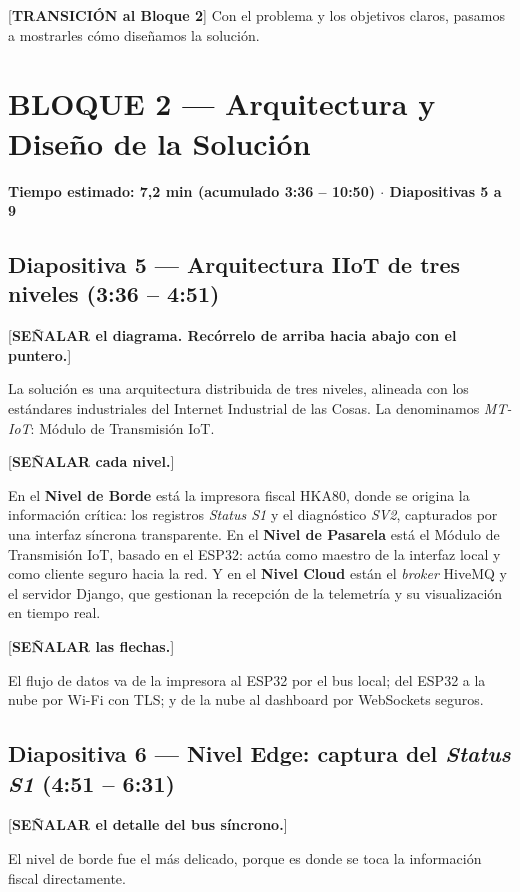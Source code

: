 \documentclass[11pt, a4paper]{article}
\begin{document}
[\textbf{TRANSICIÓN al Bloque 2}] Con el problema y los objetivos claros, pasamos a mostrarles cómo diseñamos la solución.

\hrulefill

\section*{BLOQUE 2 — Arquitectura y Diseño de la Solución}
\textbf{Tiempo estimado: 7,2 min (acumulado 3:36 – 10:50) $\cdot$ Diapositivas 5 a 9}

\subsection*{Diapositiva 5 — Arquitectura IIoT de tres niveles (3:36 – 4:51)}

[\textbf{SEÑALAR el diagrama. Recórrelo de arriba hacia abajo con el puntero.}]

La solución es una arquitectura distribuida de tres niveles, alineada con los estándares industriales del Internet Industrial de las Cosas. La denominamos \textit{MT-IoT}: Módulo de Transmisión IoT.

[\textbf{SEÑALAR cada nivel.}]

En el \textbf{Nivel de Borde} está la impresora fiscal HKA80, donde se origina la información crítica: los registros \textit{Status S1} y el diagnóstico \textit{SV2}, capturados por una interfaz síncrona transparente. En el \textbf{Nivel de Pasarela} está el Módulo de Transmisión IoT, basado en el ESP32: actúa como maestro de la interfaz local y como cliente seguro hacia la red. Y en el \textbf{Nivel Cloud} están el \textit{broker} HiveMQ y el servidor Django, que gestionan la recepción de la telemetría y su visualización en tiempo real.

[\textbf{SEÑALAR las flechas.}]

El flujo de datos va de la impresora al ESP32 por el bus local; del ESP32 a la nube por Wi-Fi con TLS; y de la nube al dashboard por WebSockets seguros.

\subsection*{Diapositiva 6 — Nivel Edge: captura del \textit{Status S1} (4:51 – 6:31)}

[\textbf{SEÑALAR el detalle del bus síncrono.}]

El nivel de borde fue el más delicado, porque es donde se toca la información fiscal directamente.
\end{document}
